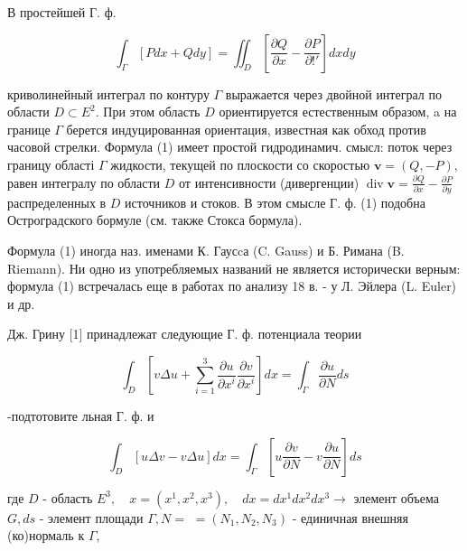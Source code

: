 \documentclass[10pt]{article}
\begin{document}
В простейшей Г. ф.



\[

\int_{\Gamma}[P d x+Q d y]=\iint_{D}\left[\frac{\partial Q}{\partial x}-\frac{\partial P}{\partial ! \prime}\right] d x d y

\]



криволинейный интеграл по контуру $\Gamma$ выражается через двойной интеграл по области $D \subset E^{2}$. При этом область $D$ ориентируется естественным образом, a на границе $\Gamma$ берется индуцированная ориентация, известная как обход против часовой стрелки. Формула (1) имеет простой гидродинамич. смысл: поток через границу області $\Gamma$ жидкости, текущей по плоскости со скоростью $\boldsymbol{v}=(Q,-P)$, равен интегралу по области $D$ от интенсивности (дивергенции) $\operatorname{div} \boldsymbol{v}=\frac{\partial Q}{\partial x}-\frac{\partial P}{\partial y}$ распределенных в $D$ источников и стоков. В этом смысле Г. ф. (1) подобна Остроградского бормуле (см. также Стокса бормула).



Формула (1) иногда наз. именами К. Гаусcа (C. Gauss) и Б. Римана (B. Riemann). Ни одно из употребляемых названий не является исторически верным: формула (1) встречалась еще в работах по анализу 18 в. - у Л. Эйлера (L. Euler) и др.



Дж. Грину [1] принадлежат следующие Г. ф. потенциала теории



\[

\int_{D}\left[v \Delta u+\sum_{i=1}^{3} \frac{\partial u}{\partial x^{i}} \frac{\partial v}{\partial x^{i}}\right] d x=\int_{\Gamma} \frac{\partial u}{\partial N} d s

\]



-подтотовите льная Г. ф. и



\[

\int_{D}[u \Delta v-v \Delta u] d x=\int_{\Gamma}\left[u \frac{\partial v}{\partial N}-v \frac{\partial u}{\partial N}\right] d s

\]



где $D$ - область $E^{3}, \quad x=\left(x^{1}, x^{2}, x^{3}\right), \quad d x=d x^{1} d x^{2} d x^{3} \rightarrow$ элемент объема $G, d s$ - элемент площади $\Gamma, N=$ $=\left(N_{1}, N_{2}, N_{3}\right)$ - единичная внешняя (ко)нормаль к $\Gamma$,
\end{document}
